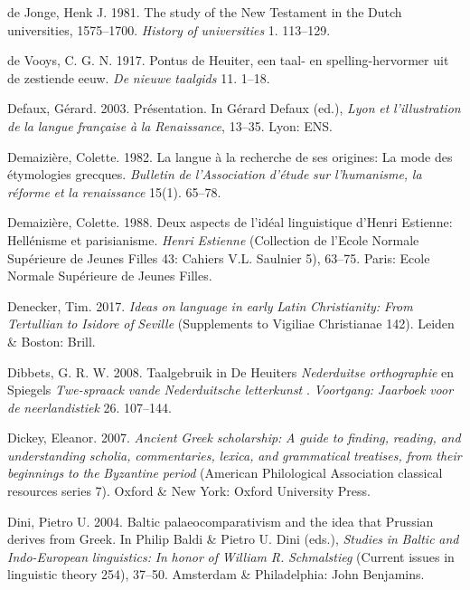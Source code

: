 de Jonge, Henk J. 1981. The study of the New Testament in the Dutch universities, 1575–1700. \textit{History} \textit{of} \textit{universities} 1. 113–129.

de Vooys, C. G. N. 1917. Pontus de Heuiter, een taal- en spelling-hervormer uit de zestiende eeuw. \textit{De} \textit{nieuwe} \textit{taalgids} 11. 1–18.

Defaux, Gérard. 2003. Présentation. In Gérard Defaux (ed.), \textit{Lyon} \textit{et} \textit{l’illustration} \textit{de} \textit{la} \textit{langue} \textit{française} \textit{à} \textit{la} \textit{Renaissance}, 13–35. Lyon: ENS.

Demaizière, Colette. 1982. La langue à la recherche de ses origines: La mode des étymologies grecques. \textit{Bulletin} \textit{de} \textit{l’Association} \textit{d’étude} \textit{sur} \textit{l’humanisme,} \textit{la} \textit{réforme} \textit{et} \textit{la} \textit{renaissance} 15(1). 65–78.

Demaizière, Colette. 1988. Deux aspects de l’idéal linguistique d’Henri Estienne: Hellénisme et parisianisme. \textit{Henri} \textit{Estienne} (Collection de l’Ecole Normale Supérieure de Jeunes Filles 43: Cahiers V.L. Saulnier 5), 63–75. Paris: Ecole Normale Supérieure de Jeunes Filles.

Denecker, Tim. 2017. \textit{Ideas} \textit{on} \textit{language} \textit{in} \textit{early} \textit{Latin} \textit{Christianity:} \textit{From} \textit{Tertullian} \textit{to} \textit{Isidore} \textit{of} \textit{Seville} (Supplements to Vigiliae Christianae 142). Leiden \& Boston: Brill.

Dibbets, G. R. W. 2008. Taalgebruik in De Heuiters \textit{Nederduitse} \textit{orthographie}  en Spiegels \textit{Twe-spraack} \textit{vande} \textit{Nederduitsche} \textit{letterkunst} . \textit{Voortgang:} \textit{Jaarboek} \textit{voor} \textit{de} \textit{neerlandistiek} 26. 107–144.

Dickey, Eleanor. 2007. \textit{Ancient} \textit{Greek} \textit{scholarship:} \textit{A} \textit{guide} \textit{to} \textit{finding,} \textit{reading,} \textit{and} \textit{understanding} \textit{scholia,} \textit{commentaries,} \textit{lexica,} \textit{and} \textit{grammatical} \textit{treatises,} \textit{from} \textit{their} \textit{beginnings} \textit{to} \textit{the} \textit{Byzantine} \textit{period} (American Philological Association classical resources series 7). Oxford \& New York: Oxford University Press.

Dini, Pietro U. 2004. Baltic palaeocomparativism and the idea that Prussian derives from Greek. In Philip Baldi \& Pietro U. Dini (eds.), \textit{Studies} \textit{in} \textit{Baltic} \textit{and} \textit{Indo-European} \textit{linguistics:} \textit{In} \textit{honor} \textit{of} \textit{William} \textit{R.} \textit{Schmalstieg} (Current issues in linguistic theory 254), 37–50. Amsterdam \& Philadelphia: John Benjamins.

